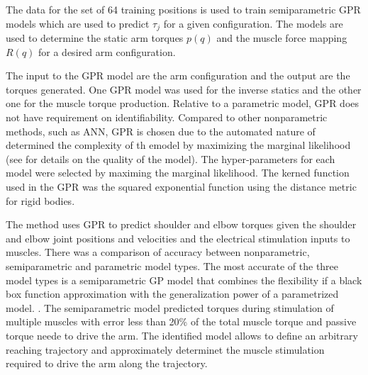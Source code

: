 The data for the set of 64 training positions is used to train semiparametric GPR models which are used to predict $\tau_j$ for a given configuration. The models are used to determine the static arm torques $p(q)$ and the muscle force mapping $R(q)$ for a desired arm configuration.

The input to the GPR model are the arm configuration and the output are the torques generated. One GPR model was used for the inverse statics and the other one for the muscle torque production. 
Relative to a parametric model, GPR does not have requirement on identifiability. Compared to other nonparametric methods, such as ANN, GPR is chosen due to the automated nature of determined the complexity of th emodel by maximizing the marginal likelihood (see \cite{SPI} for details on the quality of the model). The hyper-parameters for each model were selected by maximing the marginal likelihood. The kerned function used in the GPR was the squared exponential function using the distance metric for rigid bodies. 

The method uses GPR to predict shoulder and elbow torques given the shoulder and elbow joint positions and velocities and the electrical stimulation inputs to muscles. There was a comparison of accuracy between nonparametric, semiparametric and parametric model types. The most accurate of the three model types is a semiparametric GP model that combines the flexibility if a black box function approximation with the generalization power of a parametrized model. \cite{SPI}. The semiparametric model predicted torques during stimulation of multiple muscles with error less than 20\% of the total muscle torque and passive torque neede to drive the arm. The identified model allows to define an arbitrary reaching trajectory and approximately determinet the muscle stimulation required to drive the arm along the trajectory. 

